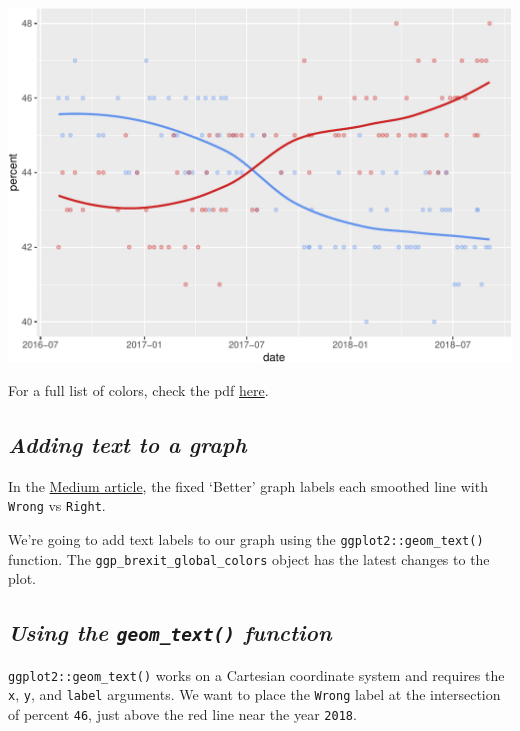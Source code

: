 \documentclass[letterpaper,12pt,twoside,]{pinp}
\begin{document}
\begin{center}\includegraphics{03-intro-to-ggplot2_files/figure-latex/scale_color_manual-1} \end{center}

For a full list of colors, check the pdf
\href{http://www.stat.columbia.edu/~tzheng/files/Rcolor.pdf}{here}.

\hypertarget{adding-text-to-a-graph}{%
\subsection{\texorpdfstring{\textbf{\emph{Adding text to a
graph}}}{Adding text to a graph}}\label{adding-text-to-a-graph}}

In the
\href{https://medium.economist.com/mistakes-weve-drawn-a-few-8cdd8a42d368}{Medium
article}, the fixed `Better' graph labels each smoothed line with
\texttt{\textquotesingle{}Wrong\textquotesingle{}} vs
\texttt{\textquotesingle{}Right\textquotesingle{}}.

We're going to add text labels to our graph using the
\texttt{ggplot2::geom\_text()} function. The
\texttt{ggp\_brexit\_global\_colors} object has the latest changes to
the plot.

\hypertarget{using-the-geom_text-function}{%
\subsection{\texorpdfstring{\textbf{\emph{Using the
\texttt{geom\_text()}
function}}}{Using the geom\_text() function}}\label{using-the-geom_text-function}}

\texttt{ggplot2::geom\_text()} works on a Cartesian coordinate system
and requires the \texttt{x}, \texttt{y}, and \texttt{label} arguments.
We want to place the \texttt{Wrong} label at the intersection of percent
\texttt{46}, just above the red line near the year \texttt{2018}.
\end{document}
